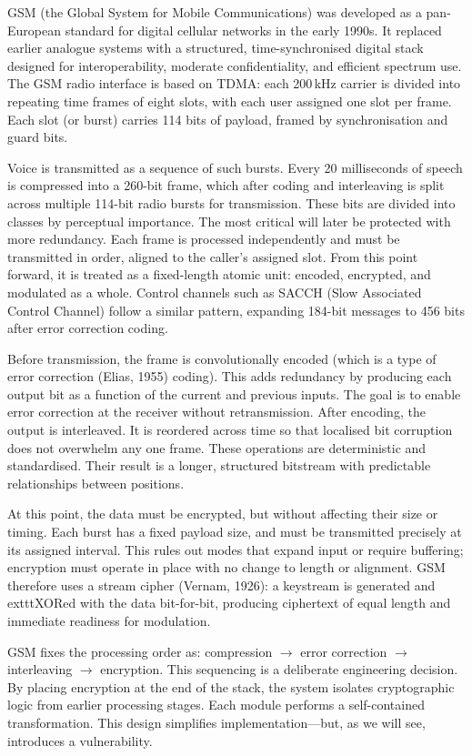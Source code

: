 GSM (the Global System for Mobile Communications) was developed as a pan-European standard for digital cellular networks in the early 1990s. It replaced earlier analogue systems with a structured, time-synchronised digital stack designed for interoperability, moderate confidentiality, and efficient spectrum use. The GSM radio interface is based on TDMA: each 200 kHz carrier is divided into repeating time frames of eight slots, with each user assigned one slot per frame. Each slot (or burst) carries 114 bits of payload, framed by synchronisation and guard bits.

Voice is transmitted as a sequence of such bursts. Every 20 milliseconds of speech is compressed into a 260-bit frame, which after coding and interleaving is split across multiple 114-bit radio bursts for transmission. These bits are divided into classes by perceptual importance. The most critical will later be protected with more redundancy. Each frame is processed independently and must be transmitted in order, aligned to the caller’s assigned slot. From this point forward, it is treated as a fixed-length atomic unit: encoded, encrypted, and modulated as a whole. Control channels such as SACCH (Slow Associated Control Channel) follow a similar pattern, expanding 184-bit messages to 456 bits after error correction coding.

Before transmission, the frame is convolutionally encoded (which is a type of error correction (Elias, 1955) coding). This adds redundancy by producing each output bit as a function of the current and previous inputs. The goal is to enable error correction at the receiver without retransmission. After encoding, the output is interleaved. It is reordered across time so that localised bit corruption does not overwhelm any one frame. These operations are deterministic and standardised. Their result is a longer, structured bitstream with predictable relationships between positions.

At this point, the data must be encrypted, but without affecting their size or timing. Each burst has a fixed payload size, and must be transmitted precisely at its assigned interval. This rules out modes that expand input or require buffering; encryption must operate in place with no change to length or alignment. GSM therefore uses a stream cipher (Vernam, 1926): a keystream is generated and 	exttt{XOR}ed with the data bit-for-bit, producing ciphertext of equal length and immediate readiness for modulation.

GSM fixes the processing order as: compression $\rightarrow$ error correction $\rightarrow$ interleaving $\rightarrow$ encryption. This sequencing is a deliberate engineering decision. By placing encryption at the end of the stack, the system isolates cryptographic logic from earlier processing stages. Each module performs a self-contained transformation. This design simplifies implementation—but, as we will see, introduces a vulnerability.

